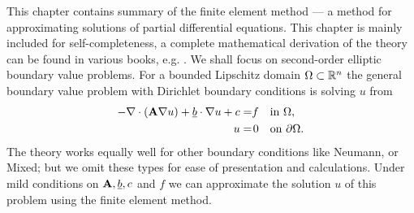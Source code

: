 \documentclass[thesis.tex]{subfiles}
\begin{document}
This chapter contains summary of the finite element method ---
a method for approximating solutions of partial differential equations.
This chapter is mainly included for self-completeness,
a complete mathematical derivation of the theory can be found in various books, e.g. \cite{brenner}. 
We shall focus on second-order elliptic boundary value problems. For a bounded Lipschitz domain $\Omega \subset \mathbb{R}^n$ the 
general boundary value problem with Dirichlet boundary conditions is solving $u$ from
\begin{equation}
  \label{eq:elliptic}
  \begin{alignedat}{2}
    -\nabla \cdot {\left(\mathbf{A} \nabla u\right)} + \underline{b} \cdot \nabla u + c &= &f \quad  &\text {in } \Omega,  \\
  u  &=& 0 \quad &\text{on } \partial\Omega.
  \end{alignedat}
\end{equation}
The theory works equally well for other boundary conditions like Neumann, or Mixed; but we omit
these types for ease of presentation and calculations. Under mild conditions on $\mathbf{A},\underline{b}, c$ 
and $f$ we can approximate the solution $u$ of this problem using the finite element method.
\end{document}
